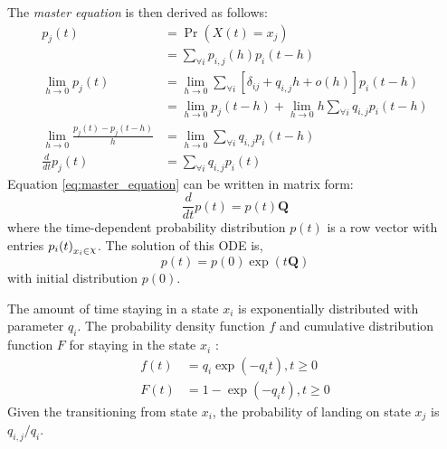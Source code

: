 The \textit{master equation} is then derived as follows:
\begin{align}
	p_{j}(t) &= \operatorname{Pr}(X(t) = x_{j}) \nonumber\\
		& =\sum_{\forall i} p_{i, j}(h) p_{i}(t-h) \nonumber \\
	\lim_{h\rightarrow 0} p_{j}(t) 
		& = \lim_{h\rightarrow 0} \sum_{\forall i} \left[ \delta_{ij}+q_{i,j} h+o(h)\right]  p_{i}(t-h) \nonumber \\ 
		& = \lim_{h\rightarrow 0} p_{j}(t-h) + \lim_{h\rightarrow 0} h \sum_{\forall i} q_{i,j} p_{i}(t-h) \nonumber \\
	\lim_{h\rightarrow 0} \frac{p_{j}(t) - p_{j}(t-h)}{h} 
		&= \lim_{h\rightarrow 0} \sum_{\forall i} q_{i,j} p_{i}(t-h) \nonumber\\
	\frac{d}{dt} p_{j}(t) & = \sum_{\forall i} q_{i,j} p_{i}(t)
	\label{eq:master_equation}
\end{align}
Equation \ref{eq:master_equation} can be written in matrix form:
\begin{equation}
\frac{d}{dt} p(t) = p(t)\textbf{Q}
\end{equation}
where the time-dependent probability distribution $ p(t) $ is a row vector with entries $ {p_{i}(t)}_{x_{i}\in \rchi} $. 
The solution of this ODE is, 
\begin{equation}
p(t)=p(0) \exp (t\textbf{Q})
\end{equation}
with initial distribution $ p(0) $.

The amount of time staying in a state $ x_{i} $ is exponentially distributed with parameter $ q_{i} $. The probability density function $ f $ and cumulative distribution function $ F $ for staying in the state $ x_{i} $ \cite{Nodelman1995}:
\begin{align}
f(t) & = q_{i} \exp \left(-q_{i} t\right), t\geq 0  \label{eq:f(t)_homo}\\
F(t) & = 1 - \exp \left(-q_{i} t\right), t\geq 0 
\end{align}
Given the transitioning from state $ x_{i} $, the probability of landing on state $ x_{j} $ is $ q_{i,j}/q_{i} $.
